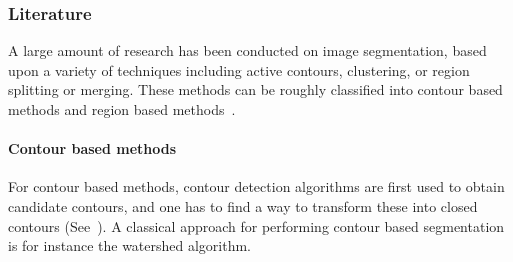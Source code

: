 \documentclass{article}
\begin{document}
        \subsubsection{Literature}
            A large amount of research has been conducted on image segmentation, based upon a variety of techniques including active contours, clustering, or region splitting or merging. These methods can be roughly classified into contour based methods and region based methods~\cite{arbelaez2011}.

            \paragraph{Contour based methods} For contour based methods, contour detection algorithms are first used to obtain candidate contours, and one has to find a way to transform these into closed contours (See~\cite{ren2005, arbelaez2011}). A classical approach for performing contour based segmentation is for instance the watershed algorithm.
\end{document}
